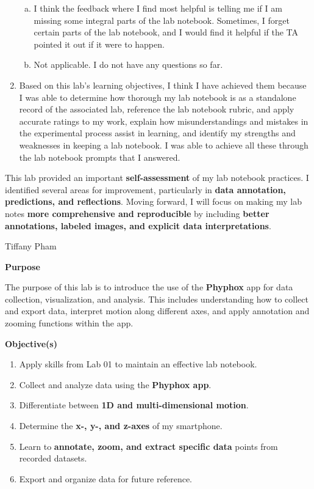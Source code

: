 \documentclass[idxtotoc,hyperref,openany]{labbook} %
\begin{document}
\begin{enumerate}
\begin{enumerate}[(a)]
        \item I think the feedback where I find most helpful is telling me if I am missing some integral parts of the lab notebook. Sometimes, I forget certain parts of the lab notebook, and I would find it helpful if the TA pointed it out if it were to happen.
        \item Not applicable. I do not have any questions so far.
    \end{enumerate}
    \item Based on this lab's learning objectives, I think I have achieved them because I was able to determine how thorough my lab notebook is as a standalone record of the associated lab, reference the lab notebook rubric, and apply accurate ratings to my work, explain how misunderstandings and mistakes in the experimental process assist in learning, and identify my strengths and weaknesses in keeping a lab notebook. I was able to achieve all these through the lab notebook prompts that I answered.
\end{enumerate}


This lab provided an important \textbf{self-assessment} of my lab notebook practices. I identified several areas for improvement, particularly in \textbf{data annotation, predictions, and reflections}. Moving forward, I will focus on making my lab notes \textbf{more comprehensive and reproducible} by including \textbf{better annotations, labeled images, and explicit data interpretations}.


\vspace{-5mm}
\vspace{-5mm}
Tiffany Pham

\textbf{Purpose}

The purpose of this lab is to introduce the use of the \textbf{Phyphox} app for data collection, visualization, and analysis. This includes understanding how to collect and export data, interpret motion along different axes, and apply annotation and zooming functions within the app.

\hfill \break
\textbf{Objective(s)}
\begin{enumerate}[$\bullet$]
    \item Apply skills from Lab 01 to maintain an effective lab notebook.
    \item Collect and analyze data using the \textbf{Phyphox app}.
    \item Differentiate between \textbf{1D and multi-dimensional motion}.
    \item Determine the \textbf{x-, y-, and z-axes} of my smartphone.
    \item Learn to \textbf{annotate, zoom, and extract specific data} points from recorded datasets.
    \item Export and organize data for future reference.
\end{enumerate}
\end{document}
